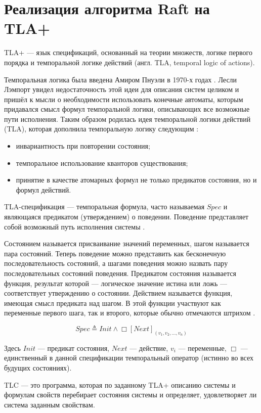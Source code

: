 \section{Реализация алгоритма Raft на TLA+}

TLA+ — язык спецификаций, основанный на теории множеств, логике первого порядка
и темпоральной логике действий (англ. TLA, temporal logic of actions).

Темпоральная логика была введена Амиром Пнуэли в 1970-х годах \cite{amir70}.
Лесли Лэмпорт увидел недостаточность этой идеи для описания систем целиком и
пришёл к мысли о необходимости использовать конечные автоматы, которым
придавался смысл формул темпоральной логики, описывающих все возможные
пути исполнения. Таким образом родилась идея темпоральной логики действий
(TLA), которая дополнила темпоральную логику следующим \cite{lamport08}:

\begin{itemize}
    \item инвариантность при повторении состояния;
    \item темпоральное использование кванторов существования;
    \item принятие в качестве атомарных формул не только предикатов состояния,
        но и формул действий.
\end{itemize}

TLA-спецификация — темпоральная формула, часто называемая $Spec$ и являющаяся
предикатом (утверждением) о поведении. Поведение представляет собой возможный
путь исполнения системы \cite{habrias06}.

Состоянием называется присваивание значений переменных, шагом называется пара
состояний. Теперь поведение можно представить как бесконечную последовательность
состояний, а шагами поведения можно назвать пару последовательных состояний
поведения. Предикатом состояния называется функция, результат которой —
логическое значение истина или ложь — соответствует утверждению о состоянии.
Действием называется функция, имеющая смысл предиката над шагом. В этой функции
участвуют как переменные первого шага, так и второго, которые обычно
отмечаются штрихом \cite{habrias06}.

$$
Spec \triangleq Init \wedge \Box [Next]_{(v_1, v_2, ..., v_n)}
$$

Здесь $Init$ — предикат состояния, $Next$ — действие, $v_i$ — переменные, $\Box$
— единственный в данной спецификации темпоральный оператор (истинно во всех
будущих состояниях).

TLC — это программа, которая по заданному TLA+ описанию системы и формулам
свойств перебирает состояния системы и определяет, удовлетворяет ли система
заданным свойствам.

